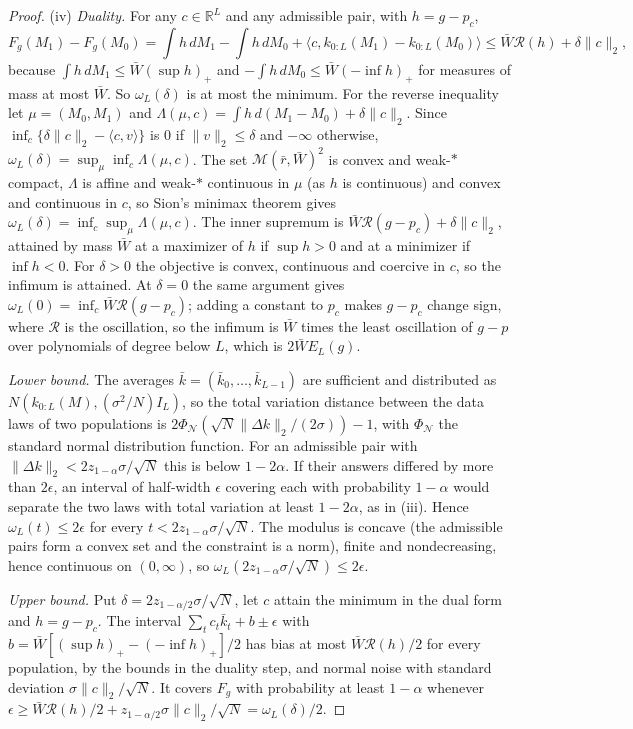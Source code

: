 \documentclass[12pt]{article}
\theoremstyle{definition}
\theoremstyle{remark}
\begin{document}
\begin{proof}
(iv) \emph{Duality.} For any $c\in\mathbb R^L$ and any admissible pair, with $h=g-p_c$,
\[
 F_g(M_1)-F_g(M_0)=\int h\,dM_1-\int h\,dM_0+\langle c,k_{0:L}(M_1)-k_{0:L}(M_0)\rangle\le\bar W\mathcal R(h)+\delta\|c\|_2,
\]
because $\int h\,dM_1\le\bar W(\sup h)_+$ and $-\int h\,dM_0\le\bar W(-\inf h)_+$ for measures of mass at most $\bar W$. So $\omega_L(\delta)$ is at most the minimum. For the reverse inequality let $\mu=(M_0,M_1)$ and $\Lambda(\mu,c)=\int h\,d(M_1-M_0)+\delta\|c\|_2$. Since $\inf_c\{\delta\|c\|_2-\langle c,v\rangle\}$ is $0$ if $\|v\|_2\le\delta$ and $-\infty$ otherwise, $\omega_L(\delta)=\sup_\mu\inf_c\Lambda(\mu,c)$. The set $\mathcal M(\bar r,\bar W)^2$ is convex and weak-$*$ compact, $\Lambda$ is affine and weak-$*$ continuous in $\mu$ (as $h$ is continuous) and convex and continuous in $c$, so Sion's minimax theorem gives $\omega_L(\delta)=\inf_c\sup_\mu\Lambda(\mu,c)$. The inner supremum is $\bar W\mathcal R(g-p_c)+\delta\|c\|_2$, attained by mass $\bar W$ at a maximizer of $h$ if $\sup h>0$ and at a minimizer if $\inf h<0$. For $\delta>0$ the objective is convex, continuous and coercive in $c$, so the infimum is attained. At $\delta=0$ the same argument gives $\omega_L(0)=\inf_c\bar W\mathcal R(g-p_c)$; adding a constant to $p_c$ makes $g-p_c$ change sign, where $\mathcal R$ is the oscillation, so the infimum is $\bar W$ times the least oscillation of $g-p$ over polynomials of degree below $L$, which is $2\bar WE_L(g)$.

\emph{Lower bound.} The averages $\bar k=(\bar k_0,\ldots,\bar k_{L-1})$ are sufficient and distributed as $N(k_{0:L}(M),(\sigma^2/N)I_L)$, so the total variation distance between the data laws of two populations is $2\Phi_{\mathcal N}(\sqrt N\|\Delta k\|_2/(2\sigma))-1$, with $\Phi_{\mathcal N}$ the standard normal distribution function. For an admissible pair with $\|\Delta k\|_2<2z_{1-\alpha}\sigma/\sqrt N$ this is below $1-2\alpha$. If their answers differed by more than $2\epsilon$, an interval of half-width $\epsilon$ covering each with probability $1-\alpha$ would separate the two laws with total variation at least $1-2\alpha$, as in (iii). Hence $\omega_L(t)\le2\epsilon$ for every $t<2z_{1-\alpha}\sigma/\sqrt N$. The modulus is concave (the admissible pairs form a convex set and the constraint is a norm), finite and nondecreasing, hence continuous on $(0,\infty)$, so $\omega_L(2z_{1-\alpha}\sigma/\sqrt N)\le2\epsilon$.

\emph{Upper bound.} Put $\delta=2z_{1-\alpha/2}\sigma/\sqrt N$, let $c$ attain the minimum in the dual form and $h=g-p_c$. The interval $\sum_tc_t\bar k_t+b\pm\epsilon$ with $b=\bar W[(\sup h)_+-(-\inf h)_+]/2$ has bias at most $\bar W\mathcal R(h)/2$ for every population, by the bounds in the duality step, and normal noise with standard deviation $\sigma\|c\|_2/\sqrt N$. It covers $F_g$ with probability at least $1-\alpha$ whenever $\epsilon\ge\bar W\mathcal R(h)/2+z_{1-\alpha/2}\sigma\|c\|_2/\sqrt N=\omega_L(\delta)/2$.


\end{proof}
\end{document}
